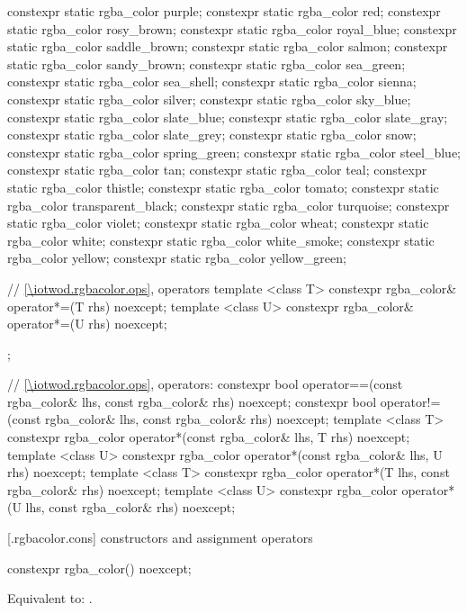 \begin{codeblock}
{{    constexpr static rgba_color purple;
    constexpr static rgba_color red;
    constexpr static rgba_color rosy_brown;
    constexpr static rgba_color royal_blue;
    constexpr static rgba_color saddle_brown;
    constexpr static rgba_color salmon;
    constexpr static rgba_color sandy_brown;
    constexpr static rgba_color sea_green;
    constexpr static rgba_color sea_shell;
    constexpr static rgba_color sienna;
    constexpr static rgba_color silver;
    constexpr static rgba_color sky_blue;
    constexpr static rgba_color slate_blue;
    constexpr static rgba_color slate_gray;
    constexpr static rgba_color slate_grey;
    constexpr static rgba_color snow;
    constexpr static rgba_color spring_green;
    constexpr static rgba_color steel_blue;
    constexpr static rgba_color tan;
    constexpr static rgba_color teal;
    constexpr static rgba_color thistle;
    constexpr static rgba_color tomato;
    constexpr static rgba_color transparent_black;
    constexpr static rgba_color turquoise;
    constexpr static rgba_color violet;
    constexpr static rgba_color wheat;
    constexpr static rgba_color white;
    constexpr static rgba_color white_smoke;
    constexpr static rgba_color yellow;
    constexpr static rgba_color yellow_green;
    
    // \ref{\iotwod.rgbacolor.ops}, operators
    template <class T>
    constexpr rgba_color& operator*=(T rhs) noexcept;
    template <class U>
    constexpr rgba_color& operator*=(U rhs) noexcept;
  };

  // \ref{\iotwod.rgbacolor.ops}, operators:
  constexpr bool operator==(const rgba_color& lhs, const rgba_color& rhs) 
    noexcept;
  constexpr bool operator!=(const rgba_color& lhs, const rgba_color& rhs) 
    noexcept;
  template <class T>
  constexpr rgba_color operator*(const rgba_color& lhs, T rhs) noexcept;
  template <class U>
  constexpr rgba_color operator*(const rgba_color& lhs, U rhs) noexcept;
  template <class T>
  constexpr rgba_color operator*(T lhs, const rgba_color& rhs) noexcept;
  template <class U>
  constexpr rgba_color operator*(U lhs, const rgba_color& rhs) noexcept;
}
\end{codeblock}

 [\iotwod.rgbacolor.cons] { constructors and assignment operators}

%
\begin{itemdecl}
constexpr rgba_color() noexcept;
\end{itemdecl}
\begin{itemdescr}
\pnum
\effects
Equivalent to: .
\end{itemdescr}

